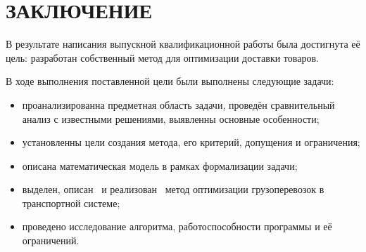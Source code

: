 \section*{ЗАКЛЮЧЕНИЕ}
	В результате написания выпускной квалификационной работы была достигнута её цель: разработан собственный метод для оптимизации доставки товаров.
	
	В ходе выполнения поставленной цели были выполнены следующие задачи:
	\begin{itemize}
		\item проанализированна предметная область задачи, проведён сравнительный анализ с известными решениями, выявленны основные особенности;
		\item установленны цели создания метода, его критерий, допущения и ограничения;
		\item описана математическая модель в рамках формализации задачи;
		\item выделен, описан \, и реализован \, метод оптимизации грузоперевозок в \, транспортной системе;
		\item проведено исследование алгоритма, работоспособности программы и её ограничений.
	\end{itemize}

\pagebreak
